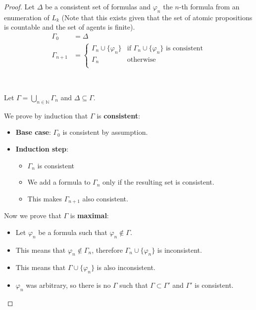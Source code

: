 \documentclass[12pt]{article}
\numberwithin{equation}{section}
\theoremstyle{definition}
\theoremstyle{definition}
\theoremstyle{remark}
\begin{document}
\begin{proof}

Let $\Delta$  be a consistent set of formulas and $\varphi _n$ the $n$-th formula from an enumeration of $L_k$ (Note that this exists given that the set of atomic propositions is countable and the set of agents is finite).
\begin{align*}
    \Gamma _0 &= \Delta\\
    \Gamma _{n + 1} &= \left \{
    \begin{array}{ll}
    \Gamma _n \cup \{ \varphi _{n} \} & \text{if }  \Gamma _n \cup \{\varphi _n \} \text{ is consistent}\\
    \Gamma _n & \text{otherwise}\\
    \end{array}
  \right.
\end{align*}


~

Let $\Gamma =  \bigcup\limits _{n \in \mathbb{N}} \Gamma _n$ and $\Delta \subseteq \Gamma$.

We prove by induction that $\Gamma$ is \textbf{consistent}:
\begin{itemize}\item \textbf{Base case}: $\Gamma _0$ is consistent by assumption.

\item \textbf{Induction step}: 
\begin{itemize}
    \item $\Gamma _n$ is consistent
    \item We add a formula to $\Gamma _n$ only if the resulting set is consistent.
    \item This makes $\Gamma _{n+1}$ also consistent.
\end{itemize}
\end{itemize}
Now we prove that $\Gamma$ is \textbf{maximal}:
\begin{itemize}
\item Let $\varphi _n$ be a formula such that $\varphi _n \notin \Gamma$.

\item This means that $\varphi _n \notin \Gamma _n$, therefore  $\Gamma _n \cup \{\varphi _n \}$ is inconsistent.

\item This means that $\Gamma \cup \{\varphi _n\}$ is also inconsistent.

\item $\varphi _n$ was arbitrary, so there is no $\Gamma$ such that $\Gamma \subset \Gamma' $ and $\Gamma'$ is consistent.
\end{itemize}


\end{proof}
\end{document}
